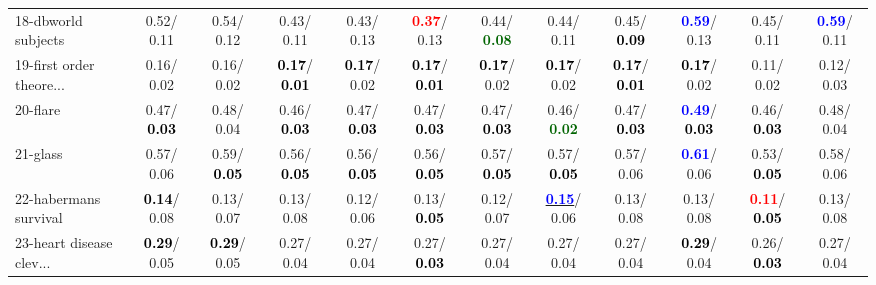 \begin{table}[h]
\begin{center}
{\begin{tabular}{lc|c|c|c|c|c|c|c|c|c|c}
18-dbworld subjects &   0.52/  0.11 &   0.54/  0.12 &   0.43/  0.11 &   0.43/  0.13 & \textcolor{red}{\textbf{  0.37}}/  0.13 &   0.44/\textcolor{darkgreen}{\textbf{  0.08}} &   0.44/  0.11 &   0.45/\textcolor{black}{\textbf{  0.09}} & \textcolor{blue}{\textbf{  0.59}}/  0.13 &   0.45/  0.11 & \textcolor{blue}{\textbf{  0.59}}/  0.11 \\
19-first order theore... &   0.16/  0.02 &   0.16/  0.02 & \textcolor{black}{\textbf{  0.17}}/\textcolor{black}{\textbf{  0.01}} & \textcolor{black}{\textbf{  0.17}}/  0.02 & \textcolor{black}{\textbf{  0.17}}/\textcolor{black}{\textbf{  0.01}} & \textcolor{black}{\textbf{  0.17}}/  0.02 & \textcolor{black}{\textbf{  0.17}}/  0.02 & \textcolor{black}{\textbf{  0.17}}/\textcolor{black}{\textbf{  0.01}} & \textcolor{black}{\textbf{  0.17}}/  0.02 &   0.11/  0.02 &   0.12/  0.03 \\
20-flare &   0.47/\textcolor{black}{\textbf{  0.03}} &   0.48/  0.04 &   0.46/\textcolor{black}{\textbf{  0.03}} &   0.47/\textcolor{black}{\textbf{  0.03}} &   0.47/\textcolor{black}{\textbf{  0.03}} &   0.47/\textcolor{black}{\textbf{  0.03}} &   0.46/\textcolor{darkgreen}{\textbf{  0.02}} &   0.47/\textcolor{black}{\textbf{  0.03}} & \textcolor{blue}{\textbf{  0.49}}/\textcolor{black}{\textbf{  0.03}} &   0.46/\textcolor{black}{\textbf{  0.03}} &   0.48/  0.04 \\
21-glass &   0.57/  0.06 &   0.59/\textcolor{black}{\textbf{  0.05}} &   0.56/\textcolor{black}{\textbf{  0.05}} &   0.56/\textcolor{black}{\textbf{  0.05}} &   0.56/\textcolor{black}{\textbf{  0.05}} &   0.57/\textcolor{black}{\textbf{  0.05}} &   0.57/\textcolor{black}{\textbf{  0.05}} &   0.57/  0.06 & \textcolor{blue}{\textbf{  0.61}}/  0.06 &   0.53/\textcolor{black}{\textbf{  0.05}} &   0.58/  0.06 \\ \hline
22-habermans survival & \textcolor{black}{\textbf{  0.14}}/  0.08 &   0.13/  0.07 &   0.13/  0.08 &   0.12/  0.06 &   0.13/\textcolor{black}{\textbf{  0.05}} &   0.12/  0.07 & \underline{\textcolor{blue}{\textbf{  0.15}}}/  0.06 &   0.13/  0.08 &   0.13/  0.08 & \textcolor{red}{\textbf{  0.11}}/\textcolor{black}{\textbf{  0.05}} &   0.13/  0.08 \\
23-heart disease clev... & \textcolor{black}{\textbf{  0.29}}/  0.05 & \textcolor{black}{\textbf{  0.29}}/  0.05 &   0.27/  0.04 &   0.27/  0.04 &   0.27/\textcolor{black}{\textbf{  0.03}} &   0.27/  0.04 &   0.27/  0.04 &   0.27/  0.04 & \textcolor{black}{\textbf{  0.29}}/  0.04 &   0.26/\textcolor{black}{\textbf{  0.03}} &   0.27/  0.04 \\

\end{tabular}}
\end{center}
\end{table}

